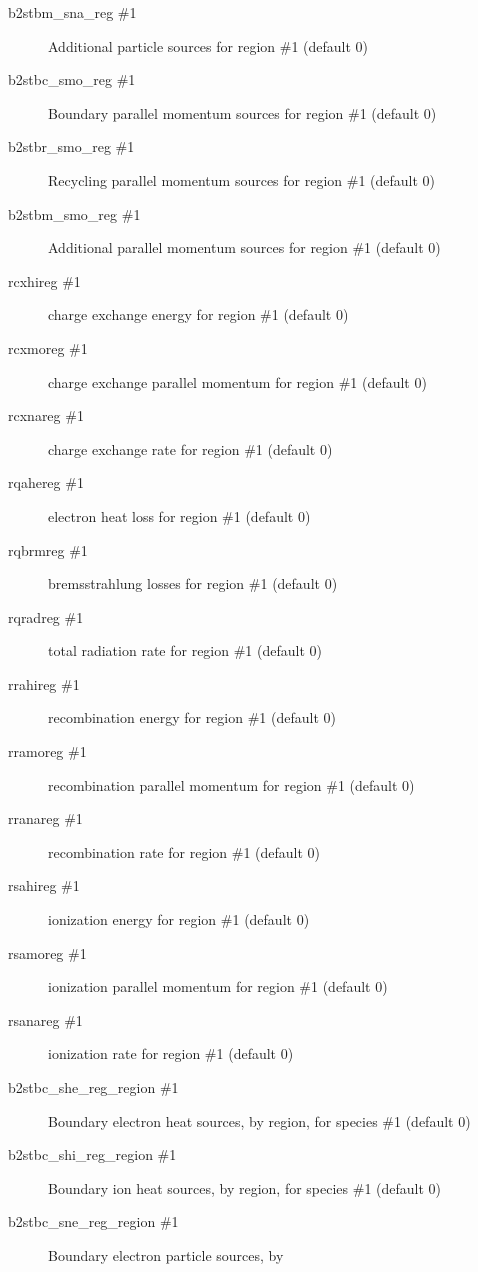 \documentclass[a4paper,10pt]{report}
\begin{document}
\begin{itemize}
\begin{description}
  \item[b2stbm\_sna\_reg \#1] Additional particle sources for region \#1 (default 0)
  \item[b2stbc\_smo\_reg \#1] Boundary parallel momentum sources for region \#1 (default 0)
  \item[b2stbr\_smo\_reg \#1] Recycling parallel momentum sources for region \#1 (default 0)
  \item[b2stbm\_smo\_reg \#1] Additional parallel momentum sources for region \#1 (default 0)
  \item[rcxhireg \#1] charge exchange energy for region \#1 (default 0)
  \item[rcxmoreg \#1] charge exchange parallel momentum for region \#1 (default 0)
  \item[rcxnareg \#1] charge exchange rate for region \#1 (default 0)
  \item[rqahereg \#1] electron heat loss for region \#1 (default 0)
  \item[rqbrmreg \#1] bremsstrahlung losses for region \#1 (default 0)
  \item[rqradreg \#1] total radiation rate for region \#1 (default 0)
  \item[rrahireg \#1] recombination energy for region \#1 (default 0)
  \item[rramoreg \#1] recombination parallel momentum for region \#1 (default 0)
  \item[rranareg \#1] recombination rate for region \#1 (default 0)
  \item[rsahireg \#1] ionization energy for region \#1 (default 0)
  \item[rsamoreg \#1] ionization parallel momentum for region \#1 (default 0)
  \item[rsanareg \#1] ionization rate for region \#1 (default 0)
  \item[b2stbc\_she\_reg\_region \#1] Boundary electron heat sources, by
    region, for species  \#1 (default 0)
  \item[b2stbc\_shi\_reg\_region \#1] Boundary ion heat sources, by
    region, for species  \#1 (default 0)
  \item[b2stbc\_sne\_reg\_region \#1] Boundary electron particle sources, by

\end{description}
\end{itemize}
\end{document}
